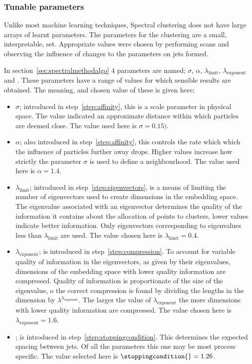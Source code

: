 \subsubsection{Tunable parameters}
Unlike most machine learning techniques, Spectral clustering does not have large arrays of learnt parameters.
The parameters for the clustering are a small, interpretable, set.
Appropriate values were chosen by performing scans and observing the influence of changes to the parameters on jets formed.

In section~\ref{sec:spectralmethodalgo} 4 parameters are named;
\(\sigma\), \(\alpha\), \(\lambda_\text{limit}\), \(\lambda_\text{exponent}\) and \stoppingdeltar{}.
These parameters have a range of values for which sensible results are obtained.
The meaning, and chosen value of these is given here;
\begin{itemize}
    \item \(\sigma\); introduced in step~\ref{step:affinity}, this is a scale parameter in physical space.
                      The value indicated an approximate distance within which particles are deemed close.
                      The value used here is \(\sigma = 0.15)\).
    \item  \(\alpha\); also introduced in step~\ref{step:affinity}, this controls the rate which which 
           the influence of particles further away drops. 
           Higher values increase how strictly the parameter \(\sigma\) is used to define a neighbourhood.
           The value used here is \(\alpha = 1.4\).
       \item  \(\lambda_\text{limit}\); introduced in step~\ref{step:eigenvectors}, is a means of limiting the number of eigenvectors used
           to create dimensions in the embedding space.
           The eigenvalue associated with an eigenvector determines the quality of the information it contains about the allocation of points to clusters,
           lower values indicate better information.
           Only eigenvectors corresponding to eigenvalues less than \(\lambda_\text{limit}\) are used.
           The value chosen here is \(\lambda_\text{limit} = 0.4\).
       \item  \(\lambda_\text{exponent}\); is introduced in step~\ref{step:compression}.
           To account for variable quality of information in the eigenvectors, as given by their eigenvalues,
        dimensions of the embedding space with lower quality information are compressed.
        Quality of information is proportionate of the size of the eigenvalue, o the correct compression is found by
        dividing the lengths in the dimension by \(\lambda^{\lambda_\text{exponent}}\).
        The larger the value of \(\lambda_\text{exponent}\) the more dimensions with lower quality information are compressed.
        The value chosen here is \(\lambda_\text{exponent} = 1.6\).
    \item \stoppingdeltar{}; is introduced in step~\ref{step:stoppingcondition}.
         This determines the expected spacing between jets. 
         Of all the parameters this one may be most process specific.
         The value selected here is \(\stoppingcondition{} = 1.26\).
\end{itemize}


